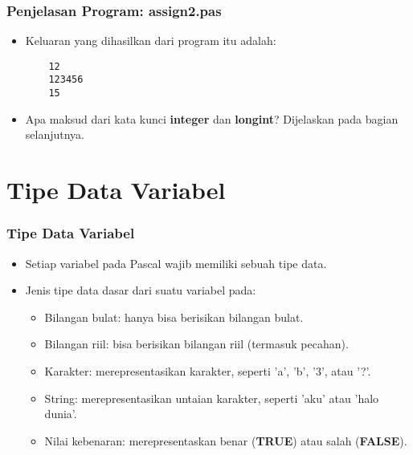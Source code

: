 \documentclass{beamer}
\begin{document}
\begin{frame}[fragile]
\frametitle{Penjelasan Program: assign2.pas}
\begin{itemize}
    \item Keluaran yang dihasilkan dari program itu adalah:
    \begin{lstlisting}
    12
    123456
    15
    \end{lstlisting}
    \item Apa maksud dari kata kunci \textbf{integer} dan \textbf{longint}? Dijelaskan pada bagian selanjutnya.
\end{itemize}
\end{frame}

\section{Tipe Data Variabel}
\frame{\sectionpage}

\begin{frame}
\frametitle{Tipe Data Variabel}
\begin{itemize}
    \item Setiap variabel pada Pascal wajib memiliki sebuah \alert{tipe data}.
    \item Jenis tipe data dasar dari suatu variabel pada:
    \begin{itemize}
        \item Bilangan bulat: hanya bisa berisikan bilangan bulat.
        \item Bilangan riil: bisa berisikan bilangan riil (termasuk pecahan).
        \item Karakter: merepresentasikan karakter, seperti 'a', 'b', '3', atau '?'.
        \item String: merepresentasikan untaian karakter, seperti 'aku' atau 'halo dunia'.
        \item Nilai kebenaran: merepresentaskan benar (\textbf{TRUE}) atau salah (\textbf{FALSE}).
    \end{itemize}
\end{itemize}
\end{frame}
\end{document}
